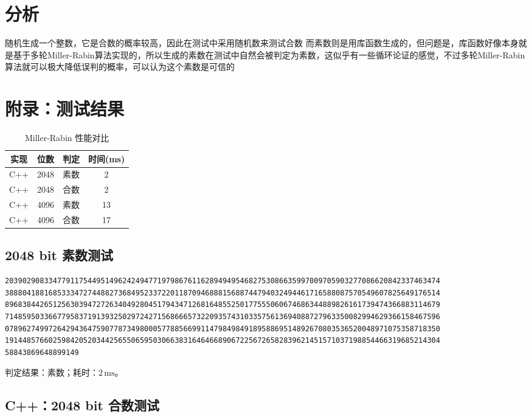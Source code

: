 \documentclass[12pt,a4paper]{article}
\begin{document}
\begin{enumerate}
\section*{分析}
随机生成一个整数，它是合数的概率较高，因此在测试中采用随机数来测试合数
而素数则是用库函数生成的，但问题是，库函数好像本身就是基于多轮Miller-Rabin算法实现的，所以生成的素数在测试中自然会被判定为素数，这似乎有一些循环论证的感觉，不过多轮Miller-Rabin算法就可以极大降低误判的概率，可以认为这个素数是可信的
\section*{附录：测试结果}
\begin{table}[htbp]
\centering
\begin{tabular}{cccc}
\toprule
实现 & 位数 & 判定 & 时间(ms) \\
\midrule
C++ & 2048 & 素数 & 2 \\
C++ & 2048 & 合数 & 2 \\
C++ & 4096 & 素数 & 13 \\
C++ & 4096 & 合数 & 17 \\
\bottomrule
\end{tabular}
\caption{Miller-Rabin 性能对比}
\end{table}

\subsection*{2048 bit 素数测试}

\begin{lstlisting}[style=numstyle]
2039029083347791175449514962424947719798676116289494954682753086635997009705903277086620842337463474
3888041881685333472744882736849523372201187094688815688744794032494461716588087570549607825649176514
8968384426512563039472726340492804517943471268164855250177555060674686344889826161739474366883114679
7148595033667795837191393250297242715686665732209357431033575613694088727963350082994629366158467596
0789627499726429436475907787349800057788566991147984984918958869514892670803536520048971075358718350
1914485766025984205203442565506595030663831646466890672256726582839621451571037198854466319685214304
58843869648899149
\end{lstlisting}

\noindent 判定结果：素数；耗时：$2\,\mathrm{ms}$。

\subsection*{C++：2048 bit 合数测试}


\end{enumerate}
\end{document}
